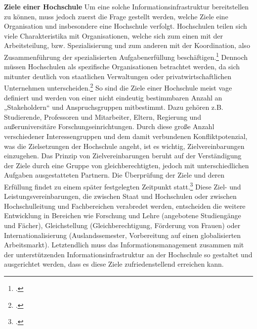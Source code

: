 \textbf{Ziele einer Hochschule}
Um eine solche Informationsinfrastruktur bereitstellen zu können, muss jedoch zuerst die Frage gestellt werden, welche Ziele eine Organisation und insbesondere eine Hochschule verfolgt.
Hochschulen teilen sich viele Charakteristika mit Organisationen, welche sich zum einen mit der Arbeitsteilung, bzw. Spezialisierung und zum anderen mit der Koordination, also  Zusammenführung der spezialisierten Aufgabenerfüllung beschäftigen.\footcite[Vgl.][]{grochla_organisationstheorie_1978} Dennoch müssen Hochschulen als spezifische Organisationen betrachtet werden, da sich mitunter deutlich von staatlichen Verwaltungen oder privatwirtschaftlichen Unternehmen unterscheiden.\footcite[Vgl.][]{muller_boling_betriebswirtschaft_1999}
So sind die Ziele einer Hochschule meist vage definiert und werden von einer nicht eindeutig bestimmbaren Anzahl an „Stakeholdern“ und Anspruchsgruppen mitbestimmt. Dazu gehören z.B. Studierende, Professoren und Mitarbeiter, Eltern, Regierung und außeruniversitäre Forschungseinrichtungen.
Durch diese große Anzahl verschiedener Interessengruppen und dem damit verbundenen Konfliktpotenzial, was die Zielsetzungen der Hochschule angeht, ist es wichtig, Zielvereinbarungen einzugehen. Das Prinzip von Zielvereinbarungen beruht auf der Verständigung der Ziele durch eine Gruppe von gleichberechtigten, jedoch mit unterschiedlichen Aufgaben ausgestatteten Partnern. Die Überprüfung der Ziele und deren Erfüllung findet zu einem später festgelegten Zeitpunkt statt.\footcite[Vgl.][]{FredowitzKrasnyZiegele_zielvereinbarungen_1999}
Diese Ziel- und Leistungsvereinbarungen, die zwischen Staat und Hochschulen oder zwischen Hochschulleitung und Fachbereichen verabredet werden, entscheiden die weitere Entwicklung in Bereichen wie Forschung und Lehre (angebotene Studiengänge und Fächer), Gleichstellung (Gleichberechtigung, Förderung von Frauen) oder Internationalisierung (Auslandssemester, Vorbereitung auf einen globalisierten Arbeitsmarkt).
Letztendlich muss das Informationsmanagement zusammen mit der unterstützenden Informationsinfrastruktur an der Hochschule so gestaltet und ausgerichtet werden, dass es diese Ziele zufriedenstellend erreichen kann. 
